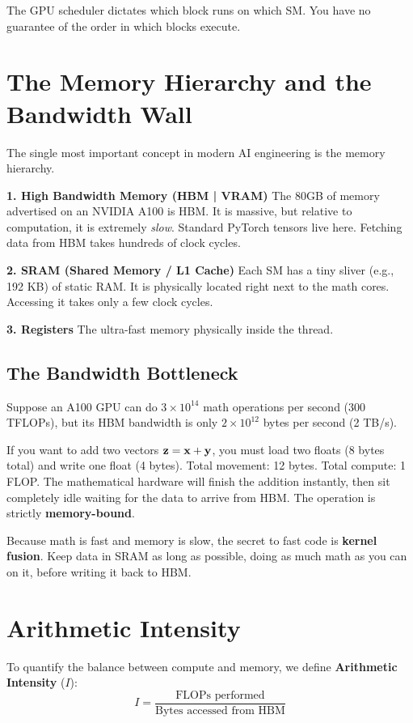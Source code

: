 The GPU scheduler dictates which block runs on which SM. You have no guarantee of the order in which blocks execute.

\section{The Memory Hierarchy and the Bandwidth Wall}

The single most important concept in modern AI engineering is the memory hierarchy.

\textbf{1. High Bandwidth Memory (HBM | VRAM)}
The 80GB of memory advertised on an NVIDIA A100 is HBM. It is massive, but relative to computation, it is extremely \emph{slow}. Standard PyTorch tensors live here. Fetching data from HBM takes hundreds of clock cycles.

\textbf{2. SRAM (Shared Memory / L1 Cache)}
Each SM has a tiny sliver (e.g., 192 KB) of static RAM. It is physically located right next to the math cores. Accessing it takes only a few clock cycles.

\textbf{3. Registers}
The ultra-fast memory physically inside the thread.

\subsection{The Bandwidth Bottleneck}
Suppose an A100 GPU can do $3 \times 10^{14}$ math operations per second (300 TFLOPs), but its HBM bandwidth is only $2 \times 10^{12}$ bytes per second (2 TB/s).

If you want to add two vectors $\mathbf{z} = \mathbf{x} + \mathbf{y}$, you must load two floats (8 bytes total) and write one float (4 bytes). Total movement: 12 bytes. Total compute: 1 FLOP. 
The mathematical hardware will finish the addition instantly, then sit completely idle waiting for the data to arrive from HBM. The operation is strictly \textbf{memory-bound}.

Because math is fast and memory is slow, the secret to fast code is \textbf{kernel fusion}. Keep data in SRAM as long as possible, doing as much math as you can on it, before writing it back to HBM.

\section{Arithmetic Intensity}

To quantify the balance between compute and memory, we define \textbf{Arithmetic Intensity} ($I$):
\begin{equation}
I = \frac{\text{FLOPs performed}}{\text{Bytes accessed from HBM}}
\end{equation}

